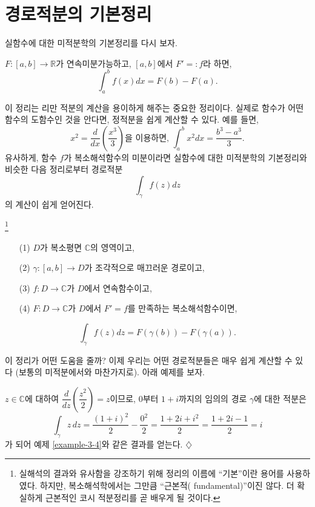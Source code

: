 \section{경로적분의 기본정리}

실함수에 대한 미적분학의 기본정리를 다시 보자.
\begin{salttheorem}{}{} \label{thm-3-2}
$F:[a,b] \to \mathbb R$가 연속미분가능하고, 
$[a,b]$에서 $F'=:f$라 하면,
\[
\int_a^b f(x)dx = F(b) - F(a).
\]
\end{salttheorem}

이 정리는 리만 적분의 계산을 용이하게 해주는 중요한 정리이다. 
실제로 함수가 어떤 함수의 도함수인 것을 안다면, 정적분을 쉽게 계산할 수 있다.
예를 들면,
\[
x^2 = \dfrac d{dx}\left( \dfrac{x^3}3\right) \text{을 이용하면, }
\int_a^b x^2 dx = \dfrac{b^3-a^3}3.
\]
유사하게,  함수 $f$가 복소해석함수의 미분이라면 
실함수에 대한 미적분학의 기본정리와 비슷한 다음 정리로부터 
경로적분
\[
\int_\gamma f(z)dz
\]
의 계산이 쉽게 얻어진다.

\begin{salttheorem}  {}{}
\footnote{실해석의 결과와 유사함을 강조하기 위해  정리의 이름에
``기본''이란 용어를 사용하였다. 하지만, 복소해석학에서는
그만큼 ``근본적( fundamental)''이진 않다. 
더 확실하게 근본적인 코시 적분정리를 곧 배우게 될 것이다. }
\label{thm-3-3}
\
\begin{itemize}
\item[(1)] $D$가 복소평면 $\mathbb C$의 영역이고,
\item[(2)] $\gamma : [a,b] \to D$가 조각적으로 매끄러운 경로이고,
\item[(3)] $f:D\to\mathbb C$가 $D$에서 연속함수이고,
\item[(4)] $F:D\to \mathbb C$가 $D$에서 $F'=f$를 만족하는 복소해석함수이면,
\end{itemize}
\[
\int_\gamma f(z)dz = F(\gamma(b)) - F(\gamma(a)).
\]
\end{salttheorem}

이 정리가 어떤 도움을 줄까?
이제 우리는 어떤 경로적분들은 매우 쉽게 계산할 수 있다
(보통의 미적분에서와 마찬가지로).
아래 예제를 보자.

\begin{saltexample}[label=example-3-5]{}{}
$z\in\mathbb C$에 대하여
$\dfrac d{dz}\left( \dfrac{z^2}2\right)=z$이므로,
$0$부터 $1+i$까지의 임의의 경로 $\gamma$에 대한 적분은
\[
\int_\gamma z\, dz = \dfrac{(1+i)^2}2 - \dfrac{0^2}2 
= \dfrac{1+2i+i^2}2 = \dfrac{1+2i-1}2 = i
\]
가 되어 예제 \ref{example-3-4}와 같은 결과를 얻는다.
\hfill $\diamondsuit$
\end{saltexample}

